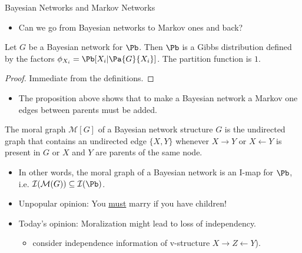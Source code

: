 \begin{frame}{Bayesian Networks and Markov Networks}
    \begin{itemize}
        \pause \item Can we go from Bayesian networks to Markov ones and back?
    \end{itemize}
    \begin{proposition}
        Let $G$ be a Bayesian network for $\Pb$. 
        Then $\Pb$ is a Gibbs distribution defined by the factors $\phi_{X_i} = \Pb[X_i | \Pa{G}{X_i}]$.
        The partition function is \pause $1$.
    \end{proposition}
    \begin{proof}
        Immediate from the definitions.
    \end{proof}
    \pause
\begin{itemize}
    \item The proposition above shows that to make a Bayesian network a Markov one edges between parents must be added.
\end{itemize}
    \pause
    \begin{definition}[Moralization]
       The moral graph $\mathcal{M}[G]$ of a Bayesian network structure $G$ is the undirected graph that contains an undirected edge $\{X,Y\}$ whenever $X \rightarrow Y$ or $X \leftarrow Y$ is present in $G$ or $X$ and $Y$ are parents of the same node.
    \end{definition}
    \begin{itemize}
        \pause \item In other words, the moral graph of a Bayesian network is an I-map for $\Pb$, i.e. $\mathcal{I}(\mathcal{M}(G)) \subseteq \mathcal{I}(\Pb)$.
        \pause \item Unpopular opinion: You \underline{must} marry if you have children!
        \pause \item Today's opinion: Moralization might lead to loss of independency.
        \begin{itemize} \item consider independence information of v-structure $X \rightarrow Z \leftarrow Y$). \end{itemize}
    \end{itemize}
\end{frame}

